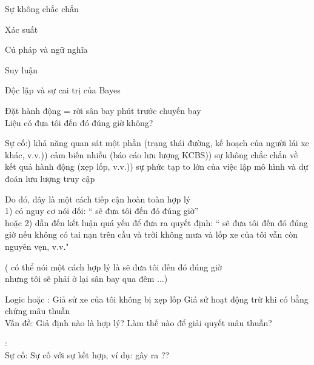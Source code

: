 \documentclass{article}
\begin{document}
\begin{huge}

\sf


\blob Sự không chắc chắn

\blob Xác suất

\blob Cú pháp và ngữ nghĩa

\blob Suy luận

\blob Độc lập và sự cai trị của Bayes



Đặt hành động  = rời sân bay  phút trước chuyến bay \\
Liệu  có đưa tôi đến đó đúng giờ không?

Sự cố:) khả năng quan sát một phần (trạng thái đường, kế hoạch của người lái xe khác, v.v.)) cảm biến nhiễu (báo cáo lưu lượng KCBS)) sự không chắc chắn về kết quả hành động (xẹp lốp, v.v.)) sự phức tạp to lớn của việc lập mô hình và dự đoán lưu lượng truy cập

Do đó, đây là một cách tiếp cận hoàn toàn hợp lý\\
\phantom{or }1) có nguy cơ nói dối: `` sẽ đưa tôi đến đó đúng giờ''\\
hoặc 2) dẫn đến kết luận quá yếu để đưa ra quyết định:\nl
`` sẽ đưa tôi đến đó đúng giờ nếu không có tai nạn trên cầu\nl
và trời không mưa và lốp xe của tôi vẫn còn nguyên vẹn, v.v."

( có thể nói một cách hợp lý là sẽ đưa tôi đến đó đúng giờ\\
nhưng tôi sẽ phải ở lại sân bay qua đêm $\ldots$)




Logic  hoặc :\al
  Giả sử xe của tôi không bị xẹp lốp\al
  Giả sử  hoạt động trừ khi có bằng chứng mâu thuẫn\\
Vấn đề: Giả định nào là hợp lý? Làm thế nào để giải quyết mâu thuẫn?

:\al
{}\al
{}\al
{}\\
Sự cố: Sự cố với sự kết hợp, ví dụ:  gây ra ??


\end{huge}
\end{document}
